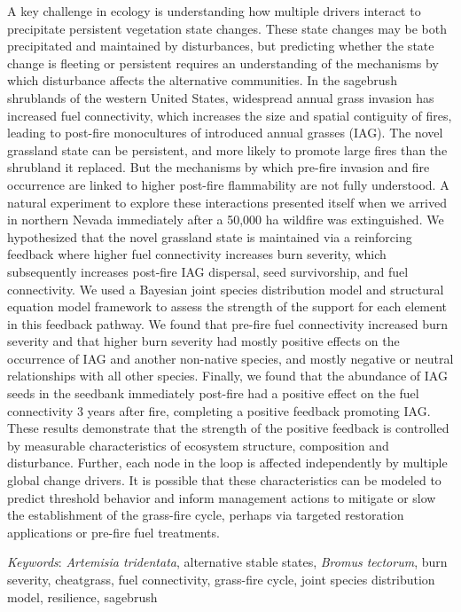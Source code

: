 \documentclass[
  12pt,
]{article}
\begin{document}
A key challenge in ecology is understanding how multiple drivers
interact to precipitate persistent vegetation state changes. These state
changes may be both precipitated and maintained by disturbances, but
predicting whether the state change is fleeting or persistent requires
an understanding of the mechanisms by which disturbance affects the
alternative communities. In the sagebrush shrublands of the western
United States, widespread annual grass invasion has increased fuel
connectivity, which increases the size and spatial contiguity of fires,
leading to post-fire monocultures of introduced annual grasses (IAG).
The novel grassland state can be persistent, and more likely to promote
large fires than the shrubland it replaced. But the mechanisms by which
pre-fire invasion and fire occurrence are linked to higher post-fire
flammability are not fully understood. A natural experiment to explore
these interactions presented itself when we arrived in northern Nevada
immediately after a 50,000 ha wildfire was extinguished. We hypothesized
that the novel grassland state is maintained via a reinforcing feedback
where higher fuel connectivity increases burn severity, which
subsequently increases post-fire IAG dispersal, seed survivorship, and
fuel connectivity. We used a Bayesian joint species distribution model
and structural equation model framework to assess the strength of the
support for each element in this feedback pathway. We found that
pre-fire fuel connectivity increased burn severity and that higher burn
severity had mostly positive effects on the occurrence of IAG and
another non-native species, and mostly negative or neutral relationships
with all other species. Finally, we found that the abundance of IAG
seeds in the seedbank immediately post-fire had a positive effect on the
fuel connectivity 3 years after fire, completing a positive feedback
promoting IAG. These results demonstrate that the strength of the
positive feedback is controlled by measurable characteristics of
ecosystem structure, composition and disturbance. Further, each node in
the loop is affected independently by multiple global change drivers. It
is possible that these characteristics can be modeled to predict
threshold behavior and inform management actions to mitigate or slow the
establishment of the grass-fire cycle, perhaps via targeted restoration
applications or pre-fire fuel treatments.

\emph{Keywords}: \emph{Artemisia tridentata}, alternative stable states,
\emph{Bromus tectorum}, burn severity, cheatgrass, fuel connectivity,
grass-fire cycle, joint species distribution model, resilience,
sagebrush
\end{document}
